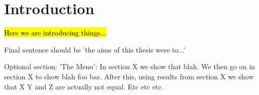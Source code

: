 
\chapter{Introduction}
\label{chap:introduction}

\hl{Here we are introducing things...}

Final sentence should be 'the aims of this thesis were to...'

Optional section: 'The Menu': In section X we show that blah.
We then go on in section X to show blah foo bar.
After this, using results from section X we show that X Y and Z are actually not equal.
Etc etc etc.